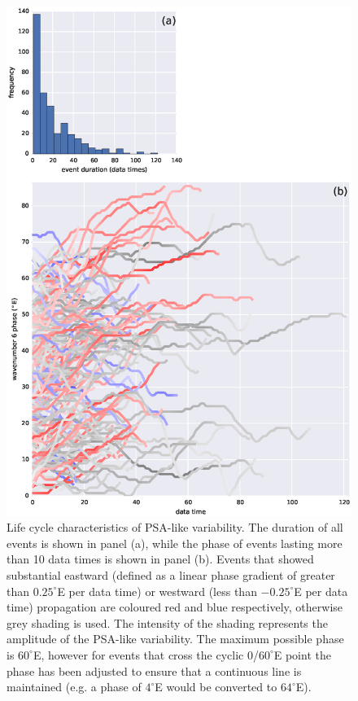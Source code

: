 \begin{figure}
\begin{center}
\includegraphics[width=0.8\columnwidth]{figures/psa/Figure4-4.eps}
\caption[Life cycle characteristics of PSA-like variability]{\label{fig:lifecycle}
Life cycle characteristics of PSA-like variability. The duration of all events is shown in panel (a), while the phase of events lasting more than 10 data times is shown in panel (b). Events that showed substantial eastward (defined as a linear phase gradient of greater than $0.25^{\circ}$E per data time) or westward (less than $-0.25^{\circ}$E per data time) propagation are coloured red and blue respectively, otherwise grey shading is used. The intensity of the shading represents the amplitude of the PSA-like variability. The maximum possible phase is $60^{\circ}$E, however for events that cross the cyclic 0/$60^{\circ}$E point the phase has been adjusted to ensure that a continuous line is maintained (e.g. a phase of $4^{\circ}$E would be converted to $64^{\circ}$E). %
}
\end{center}
\end{figure}

